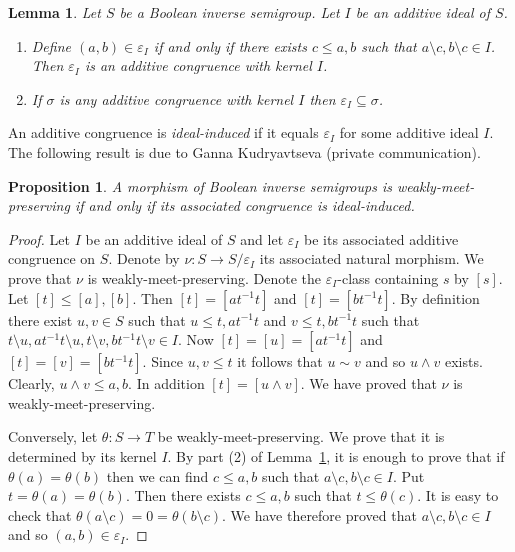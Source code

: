 \documentclass[a4paper]{amsart}
\newtheorem{lemma}[theorem]{Lemma}
\newtheorem{proposition}[theorem]{Proposition}
\begin{document}
\begin{lemma}\label{lem:noise} Let $S$ be a Boolean inverse semigroup.
Let $I$ be an additive ideal of $S$.
\begin{enumerate}
\item Define $(a,b) \in \varepsilon_{I}$ if and only if there exists $c \leq a,b$ such that $a \setminus c, b \setminus c \in I$.
Then $\varepsilon_{I}$ is an additive congruence with kernel $I$.
\item If $\sigma$ is any additive congruence with kernel $I$ then $ \varepsilon_{I} \subseteq \sigma$.
\end{enumerate}
\end{lemma}

An additive congruence is {\em ideal-induced} if it equals $\varepsilon_{I}$ for some additive ideal $I$.
The following result is due to Ganna Kudryavtseva (private communication).

\begin{proposition}\label{prop:anja} A morphism of Boolean inverse semigroups is weakly-meet-pre\-serving if
and only if its associated congruence is ideal-induced.
\end{proposition}
\begin{proof} Let $I$ be an additive ideal of $S$ and let $\varepsilon_{I}$ be its associated additive congruence on $S$.
Denote by $\nu \colon S \rightarrow S/\varepsilon_{I}$ its associated natural morphism.
We prove that $\nu$ is weakly-meet-preserving.
Denote the $\varepsilon_{I}$-class containing $s$ by $[s]$.
Let $[t] \leq [a], [b]$.
Then $[t] = [at^{-1}t]$ and $[t] = [bt^{-1}t]$.
By definition there exist $u,v \in S$ such that
$u \leq t,at^{-1}t$ and $v \leq t,bt^{-1}t$ such that
$t \setminus u, at^{-1}t \setminus u, t \setminus v, bt^{-1}t \setminus v \in I$.
Now $[t] = [u] = [at^{-1}t]$ and $[t] = [v] = [bt^{-1}t]$.
Since $u,v \leq t$ it follows that $u \sim v$ and so $u \wedge v$ exists.
Clearly, $u \wedge v \leq a,b$.
In addition $[t] = [u \wedge v]$.
We have proved that $\nu$ is weakly-meet-preserving.

Conversely, let $\theta \colon S \rightarrow T$ be weakly-meet-preserving.
We prove that it is determined by its kernel $I$.
By part (2) of Lemma~\ref{lem:noise}, it is enough to prove that if $\theta (a) = \theta (b)$ then
we can find $c \leq a,b$ such that $a \setminus c, b \setminus c \in I$.
Put $t = \theta (a) = \theta (b)$.
Then there exists $c \leq a,b$ such that $t \leq \theta (c)$.
It is easy to check that $\theta (a \setminus c) = 0 = \theta (b \setminus c)$.
We have therefore proved that $a \setminus c, b \setminus c \in I$ and so $(a,b) \in \varepsilon_{I}$.
\end{proof}
\end{document}
